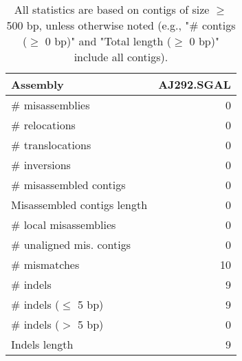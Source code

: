\documentclass[12pt,a4paper]{article}
\begin{document}
\begin{table}[ht]
\begin{center}
\caption{All statistics are based on contigs of size $\geq$ 500 bp, unless otherwise noted (e.g., "\# contigs ($\geq$ 0 bp)" and "Total length ($\geq$ 0 bp)" include all contigs).}
\begin{tabular}{|l*{1}{|r}|}
\hline
Assembly & AJ292.SGAL \\ \hline
\# misassemblies & 0 \\ \hline
\hspace{5mm}\# relocations & 0 \\ \hline
\hspace{5mm}\# translocations & 0 \\ \hline
\hspace{5mm}\# inversions & 0 \\ \hline
\# misassembled contigs & 0 \\ \hline
Misassembled contigs length & 0 \\ \hline
\# local misassemblies & 0 \\ \hline
\# unaligned mis. contigs & 0 \\ \hline
\# mismatches & 10 \\ \hline
\# indels & 9 \\ \hline
\hspace{5mm}\# indels ($\leq$ 5 bp) & 9 \\ \hline
\hspace{5mm}\# indels ($>$ 5 bp) & 0 \\ \hline
Indels length & 9 \\ \hline
\end{tabular}
\end{center}
\end{table}
\end{document}
